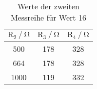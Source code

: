 \begin{table}[H]
  \centering
  \caption{Werte der zweiten Messreihe für Wert 16}
  \label{tab:tabe2}
    \begin{tabular}{c c c}
    \toprule
    $ \text{R}_2 \: / \: \si{\ohm} $ & $\text{R}_3 \: / \: \si{\ohm} $ &
    $\text{R}_4 \: / \: \si{\ohm} $ \\
    \midrule
    500 & 178 & 328 \\
    664 & 178 & 328 \\
    1000 & 119 & 332 \\
    \bottomrule
    \end{tabular}
\end{table}
